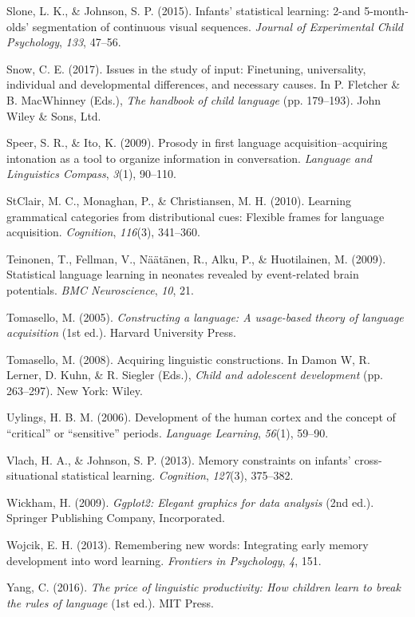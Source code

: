 \documentclass[
  english,
  man,floatsintext]{apa6}
\begin{document}
\leavevmode\hypertarget{ref-slone2015infants}{}%
Slone, L. K., \& Johnson, S. P. (2015). Infants' statistical learning: 2-and 5-month-olds' segmentation of continuous visual sequences. \emph{Journal of Experimental Child Psychology}, \emph{133}, 47--56.

\leavevmode\hypertarget{ref-snow2017issues}{}%
Snow, C. E. (2017). Issues in the study of input: Finetuning, universality, individual and developmental differences, and necessary causes. In P. Fletcher \& B. MacWhinney (Eds.), \emph{The handbook of child language} (pp. 179--193). John Wiley \& Sons, Ltd.

\leavevmode\hypertarget{ref-speer2009prosody}{}%
Speer, S. R., \& Ito, K. (2009). Prosody in first language acquisition--acquiring intonation as a tool to organize information in conversation. \emph{Language and Linguistics Compass}, \emph{3}(1), 90--110.

\leavevmode\hypertarget{ref-clair2010learning}{}%
StClair, M. C., Monaghan, P., \& Christiansen, M. H. (2010). Learning grammatical categories from distributional cues: Flexible frames for language acquisition. \emph{Cognition}, \emph{116}(3), 341--360.

\leavevmode\hypertarget{ref-teinonen2009statistical}{}%
Teinonen, T., Fellman, V., Näätänen, R., Alku, P., \& Huotilainen, M. (2009). Statistical language learning in neonates revealed by event-related brain potentials. \emph{BMC Neuroscience}, \emph{10}, 21.

\leavevmode\hypertarget{ref-tomasello2003constructing}{}%
Tomasello, M. (2005). \emph{Constructing a language: A usage-based theory of language acquisition} (1st ed.). Harvard University Press.

\leavevmode\hypertarget{ref-tomasello2006acquiring}{}%
Tomasello, M. (2008). Acquiring linguistic constructions. In Damon W, R. Lerner, D. Kuhn, \& R. Siegler (Eds.), \emph{Child and adolescent development} (pp. 263--297). New York: Wiley.

\leavevmode\hypertarget{ref-uylings2006development}{}%
Uylings, H. B. M. (2006). Development of the human cortex and the concept of ``critical'' or ``sensitive'' periods. \emph{Language Learning}, \emph{56}(1), 59--90.

\leavevmode\hypertarget{ref-vlach2013memory}{}%
Vlach, H. A., \& Johnson, S. P. (2013). Memory constraints on infants' cross-situational statistical learning. \emph{Cognition}, \emph{127}(3), 375--382.

\leavevmode\hypertarget{ref-ggplot2}{}%
Wickham, H. (2009). \emph{Ggplot2: Elegant graphics for data analysis} (2nd ed.). Springer Publishing Company, Incorporated.

\leavevmode\hypertarget{ref-wojcik2013remembering}{}%
Wojcik, E. H. (2013). Remembering new words: Integrating early memory development into word learning. \emph{Frontiers in Psychology}, \emph{4}, 151.

\leavevmode\hypertarget{ref-yang2016price}{}%
Yang, C. (2016). \emph{The price of linguistic productivity: How children learn to break the rules of language} (1st ed.). MIT Press.

\endgroup
\end{document}
